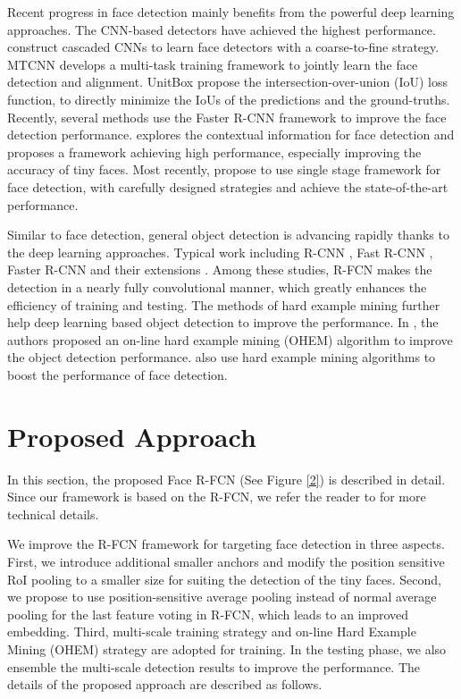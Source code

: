 \documentclass{article} %
\newcommand{\ignore}[1]{}
\begin{document}
Recent progress in face detection mainly benefits from the powerful 
deep learning approaches. The CNN-based detectors have achieved the highest
performance. \cite{cascadeCNN,cascadeCNN2,spl} construct cascaded CNNs to learn face detectors with a coarse-to-fine
strategy.  MTCNN \cite{spl} develops a multi-task training framework to jointly learn the face detection and alignment.
UnitBox \cite{unitbox} propose the intersection-over-union (IoU) loss function, to directly minimize the
IoUs of the predictions and the ground-truths. Recently, 
several methods \cite{facefrcnn,xm,deepir,cmsrcnn} use the Faster R-CNN framework to improve the face detection performance.
\cite{HR} explores the contextual information for face detection and proposes a framework achieving high performance, especially improving the accuracy of tiny faces. Most recently, \cite{ssh,sfd} propose to use single stage framework for face detection, with carefully designed strategies and achieve the state-of-the-art performance.


Similar to face detection, general object detection is advancing rapidly thanks to the deep learning approaches. 
Typical\ignore{Representative} work including R-CNN \cite{RCNNs}, Fast R-CNN \cite{FastRCNN}, Faster R-CNN \cite{FasterRCNN} and their extensions \cite{RFCN,FPN,maskrcnn}. Among these studies, R-FCN makes the detection in a nearly fully convolutional manner, which greatly enhances the efficiency of training and testing.
The methods of hard example mining further help deep learning based object detection to improve the performance. In \cite{OHEM}, the authors proposed an on-line hard example mining (OHEM) algorithm to improve the object detection performance. \cite{xm,deepir,spl} also use hard example mining algorithms to boost the performance of face detection.

\section{Proposed Approach}


In this section, the proposed Face R-FCN (See Figure \ref{2}) is described in detail. Since our framework is based on the R-FCN, we refer the reader to \cite{RFCN} for more technical details.

We improve the R-FCN framework for targeting face detection in three aspects.
First, we introduce additional smaller anchors and modify the position sensitive RoI pooling to a smaller size for suiting the detection of the tiny faces. 
Second, we propose to use position-sensitive average pooling instead of normal average pooling for the last feature voting in R-FCN, which leads to an improved embedding. 
Third, multi-scale training strategy and on-line Hard Example Mining (OHEM) strategy \cite{OHEM} are adopted for training. In the testing phase, we also ensemble the multi-scale detection results to improve the performance. 
The details of the proposed approach are described as follows.
\end{document}
